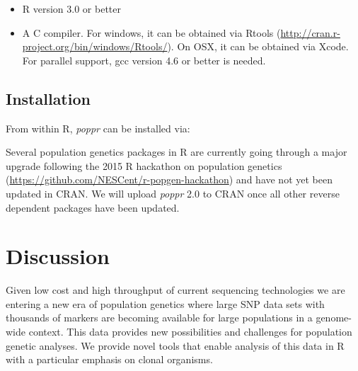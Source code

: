\documentclass[double,11pt]{beavtex}
\providecommand{\tightlist}{%
  \setlength{\itemsep}{0pt}\setlength{\parskip}{0pt}}
\begin{document}
  \begin{itemize}
  \tightlist
  \item
    R version 3.0 or better
  \item
    A C compiler. For windows, it can be obtained via Rtools
    (\url{http://cran.r-project.org/bin/windows/Rtools/}). On OSX, it can
    be obtained via Xcode. For parallel support, gcc version 4.6 or better
    is needed.
  \end{itemize}
  
  \newpage
  
  \subsection{Installation}\label{installation}
  
  From within R, \emph{poppr} can be installed via:
  
  \begin{Shaded}
  \begin{Highlighting}[]
  \NormalTok{(}\NormalTok{)}
  \NormalTok{(}\NormalTok{)}
  \NormalTok{(}\NormalTok{)}
  \NormalTok{(}\NormalTok{)}
  \end{Highlighting}
  \end{Shaded}
  
  Several population genetics packages in R are currently going through a
  major upgrade following the 2015 R hackathon on population genetics
  (\url{https://github.com/NESCent/r-popgen-hackathon}) and have not yet
  been updated in CRAN. We will upload \emph{poppr} 2.0 to CRAN once all
  other reverse dependent packages have been updated.
  
  \section{Discussion}\label{discussion}
  
  Given low cost and high throughput of current sequencing technologies we
  are entering a new era of population genetics where large SNP data sets
  with thousands of markers are becoming available for large populations
  in a genome- wide context. This data provides new possibilities and
  challenges for population genetic analyses. We provide novel tools that
  enable analysis of this data in R with a particular emphasis on clonal
  organisms.
  
\end{document}
